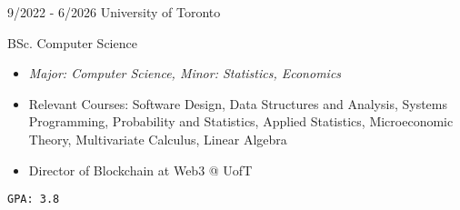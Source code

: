 \documentclass[9pt]{developercv} %
\begin{document}
\vspace{-10 pt}
\begin{entrylist}
    \entry
		{9/2022 - 6/2026}
		{University of Toronto}
		{}
		{BSc. Computer Science
        \vspace{5pt}
        \begin{itemize}[itemsep=3pt,topsep=0pt,parsep=0pt,partopsep=0pt, leftmargin=-1pt]
            \item \textit{Major: Computer Science, Minor: Statistics, Economics}
            \item Relevant Courses: Software Design, Data Structures and Analysis, Systems Programming, Probability and Statistics, Applied Statistics, Microeconomic Theory, Multivariate Calculus, Linear Algebra
            \item Director of Blockchain at Web3 @ UofT
        \end{itemize}
        \vspace{5pt}
        \texttt{GPA: 3.8}
        }
\end{entrylist}
\end{document}
